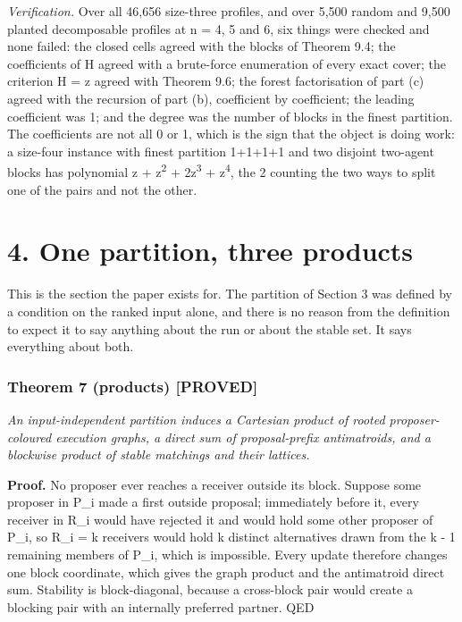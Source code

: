 \documentclass[
  11pt,
]{article}
\begin{document}
\emph{Verification.} Over all 46,656 size-three profiles, and over 5,500
random and 9,500 planted decomposable profiles at n = 4, 5 and 6, six
things were checked and none failed: the closed cells agreed with the
blocks of Theorem 9.4; the coefficients of H agreed with a brute-force
enumeration of every exact cover; the criterion H = z agreed with
Theorem 9.6; the forest factorisation of part (c) agreed with the
recursion of part (b), coefficient by coefficient; the leading
coefficient was 1; and the degree was the number of blocks in the finest
partition. The coefficients are not all 0 or 1, which is the sign that
the object is doing work: a size-four instance with finest partition
1+1+1+1 and two disjoint two-agent blocks has polynomial z +
z\textsuperscript{2} + 2z\textsuperscript{3} + z\textsuperscript{4}, the
2 counting the two ways to split one of the pairs and not the other.

\clearpage

\hypertarget{one-partition-three-products}{%
\section{4. One partition, three
products}\label{one-partition-three-products}}

This is the section the paper exists for. The partition of Section 3 was
defined by a condition on the ranked input alone, and there is no reason
from the definition to expect it to say anything about the run or about
the stable set. It says everything about both.


\hypertarget{theorem-7-products-proved}{%
\subsubsection{Theorem 7 (products)
{[}PROVED{]}}\label{theorem-7-products-proved}}

\emph{An input-independent partition induces a Cartesian product of
rooted proposer-coloured execution graphs, a direct sum of
proposal-prefix antimatroids, and a blockwise product of stable
matchings and their lattices.}


\textbf{Proof.} No proposer ever reaches a receiver outside its block.
Suppose some proposer in P\_i made a first outside proposal; immediately
before it, every receiver in R\_i would have rejected it and would hold
some other proposer of P\_i, so \textbar R\_i\textbar{} = k receivers
would hold k distinct alternatives drawn from the k - 1 remaining
members of P\_i, which is impossible. Every update therefore changes one
block coordinate, which gives the graph product and the antimatroid
direct sum. Stability is block-diagonal, because a cross-block pair
would create a blocking pair with an internally preferred partner. QED
\end{document}
